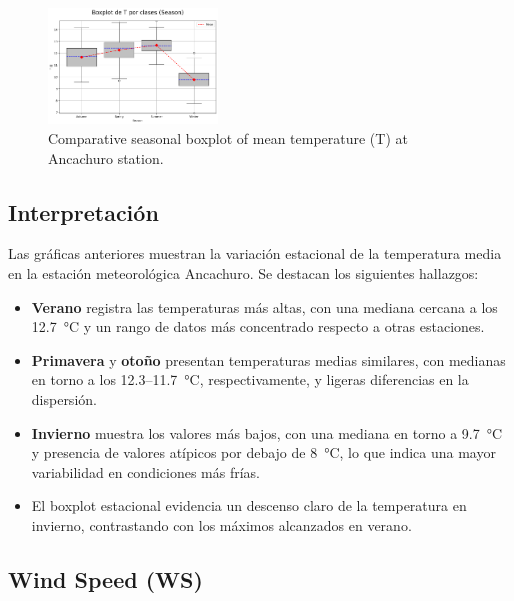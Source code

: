 \vspace{0.2cm}

\begin{figure}[H]
\centering
\includegraphics[width=0.4\textwidth]{resultados/por_estacion_del_anio/boxplot_clases_por_estacion/Ancachuro/T_ClassBoxplot_Season.png}
\caption{Comparative seasonal boxplot of mean temperature (T) at Ancachuro station.}
\label{fig:ancachuro_t_box}
\end{figure}

\subsection*{Interpretación}

Las gráficas anteriores muestran la variación estacional de la temperatura media en la estación meteorológica Ancachuro. Se destacan los siguientes hallazgos:

\begin{itemize}
    \item \textbf{Verano} registra las temperaturas más altas, con una mediana cercana a los 12.7~°C y un rango de datos más concentrado respecto a otras estaciones.
    \item \textbf{Primavera} y \textbf{otoño} presentan temperaturas medias similares, con medianas en torno a los 12.3–11.7~°C, respectivamente, y ligeras diferencias en la dispersión.
    \item \textbf{Invierno} muestra los valores más bajos, con una mediana en torno a 9.7~°C y presencia de valores atípicos por debajo de 8~°C, lo que indica una mayor variabilidad en condiciones más frías.
    \item El boxplot estacional evidencia un descenso claro de la temperatura en invierno, contrastando con los máximos alcanzados en verano.
\end{itemize}



\subsection{Wind Speed (WS)}

